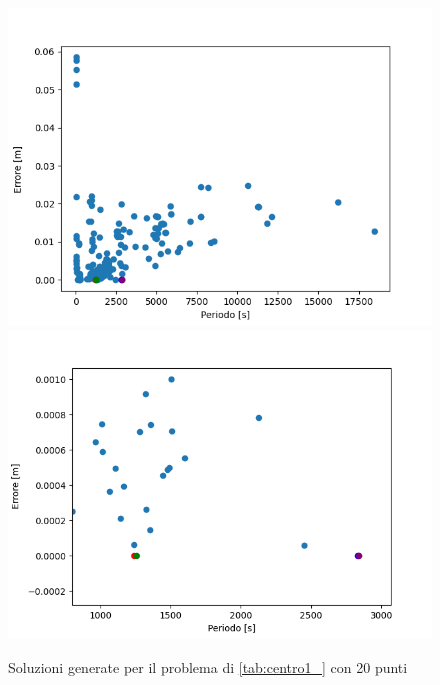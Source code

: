 \documentclass[a4paper,12pt]{report}
\begin{document}
\begin{figure}
  \center
  \includegraphics[scale=0.70]{img/puls005/tutte_le_soluzioni.png}
  \includegraphics[scale=0.70]{img/puls005/tutte_le_soluzioni_2.png}
  \caption{Soluzioni generate per il problema di \ref{tab:centro1_} con 20 punti}
  \label{fig:tutte_le_soluzioni}
\end{figure}
\end{document}
